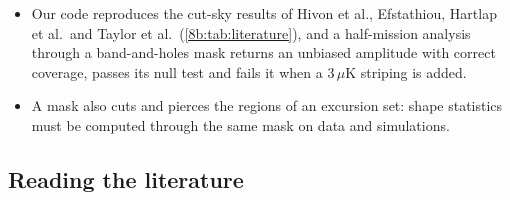 \begin{recap}
\begin{itemize}[itemsep=1pt,leftmargin=1.2em]
        $(n-1)/(n-p-2)$; the Hartlap factor removes the bias, not the noise. A parameter variance is then
        uncertain by $\sqrt{2/(n-p)}$, and $n>2/\varepsilon^2+p+4$ simulations give fractional precision $\varepsilon$.
  \item Our code reproduces the cut-sky results of Hivon et al., Efstathiou, Hartlap et al.\ and Taylor et al.\
        (\cref{8b:tab:literature}), and a half-mission analysis through a band-and-holes mask returns an
        unbiased amplitude with correct coverage, passes its null test and fails it when a $3\,\mu$K striping is added.
  \item A mask also cuts and pierces the regions of an excursion set: shape statistics must be computed through
        the same mask on data and simulations.
\end{itemize}
\end{recap}

\subsection*{Reading the literature}
\label{8b:sec:reading-list}

